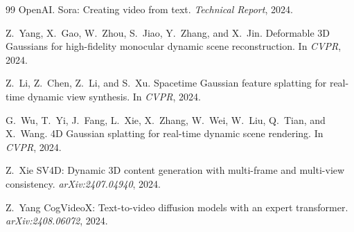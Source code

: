 \begin{thebibliography}{99}
{OpenAI}.
Sora: Creating video from text.
\emph{Technical Report}, 2024.

Z.~Yang, X.~Gao, W.~Zhou, S.~Jiao, Y.~Zhang, and X.~Jin.
Deformable 3{D} Gaussians for high-fidelity monocular dynamic scene reconstruction.
In \emph{CVPR}, 2024.

Z.~Li, Z.~Chen, Z.~Li, and S.~Xu.
Spacetime Gaussian feature splatting for real-time dynamic view synthesis.
In \emph{CVPR}, 2024.

G.~Wu, T.~Yi, J.~Fang, L.~Xie, X.~Zhang, W.~Wei, W.~Liu, Q.~Tian, and X.~Wang.
4{D} Gaussian splatting for real-time dynamic scene rendering.
In \emph{CVPR}, 2024.

Z.~Xie \etal
{SV4D}: Dynamic 3{D} content generation with multi-frame and multi-view consistency.
\emph{arXiv:2407.04940}, 2024.

Z.~Yang \etal
{CogVideoX}: Text-to-video diffusion models with an expert transformer.
\emph{arXiv:2408.06072}, 2024.



\end{thebibliography}


